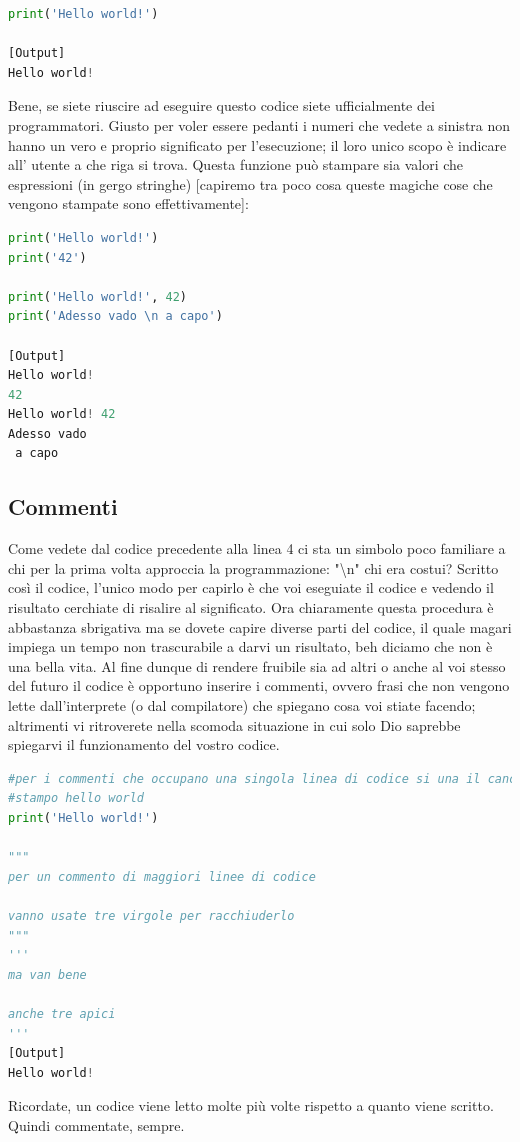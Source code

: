 \documentclass[10pt,a4paper]{article}
\begin{document}
\begin{lstlisting}[language=Python]
print('Hello world!')

[Output]
Hello world!
\end{lstlisting}
Bene, se siete riuscire ad eseguire questo codice siete ufficialmente dei programmatori. Giusto per voler essere pedanti i numeri che vedete a sinistra non hanno un vero e proprio significato per l'esecuzione; il loro unico scopo è indicare all' utente a che riga si trova. Questa funzione può stampare sia valori che espressioni (in gergo stringhe) [capiremo tra poco cosa queste magiche cose che vengono stampate sono effettivamente]:
\begin{lstlisting}[language=Python]
print('Hello world!')
print('42')

print('Hello world!', 42)
print('Adesso vado \n a capo')

[Output]
Hello world!
42
Hello world! 42
Adesso vado 
 a capo
\end{lstlisting}
\subsection{Commenti}
Come vedete dal codice precedente alla linea 4 ci sta un simbolo poco familiare a chi per la prima volta approccia la programmazione: "\textbackslash n" chi era costui? Scritto così il codice, l'unico modo per capirlo è che voi eseguiate il codice e vedendo il risultato cerchiate di risalire al significato. Ora chiaramente questa procedura è abbastanza sbrigativa ma se dovete capire diverse parti del codice, il quale magari impiega un tempo non trascurabile a darvi un risultato, beh diciamo che non è una bella vita. Al fine dunque di rendere fruibile sia ad altri o anche al voi stesso del futuro il codice è opportuno inserire i commenti, ovvero frasi che non vengono lette dall'interprete (o dal compilatore) che spiegano cosa voi stiate facendo; altrimenti vi ritroverete nella scomoda situazione in cui solo Dio saprebbe spiegarvi il funzionamento del vostro codice.

\begin{lstlisting}[language=Python]
#per i commenti che occupano una singola linea di codice si una il cancelletto
#stampo hello world
print('Hello world!')

"""
per un commento di maggiori linee di codice

vanno usate tre virgole per racchiuderlo
"""
'''
ma van bene

anche tre apici
'''
[Output]
Hello world!
\end{lstlisting}
Ricordate, un codice viene letto molte più volte rispetto a quanto viene scritto. Quindi commentate, sempre.
\end{document}
